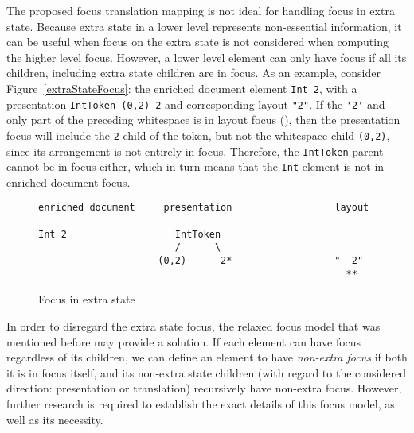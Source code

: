 The proposed focus translation mapping is not ideal for handling focus in extra state. Because extra state in a lower level represents non-essential information, it can be useful when focus on the extra state is not considered when computing the higher level focus. However, a lower level element can only have focus if all its children, including extra state children are in focus. As an example, consider Figure~\ref{extraStateFocus}: the enriched document element \verb|Int 2|, with a presentation \verb|IntToken (0,2) 2| and corresponding layout \verb|"|\textvisiblespace\textvisiblespace\verb|2"|. If the \verb|'2'| and only part of the preceding whitespace is in layout focus ({\tt \textvisiblespace{}}), then the presentation focus will include the \verb|2| child of the token, but not the whitespace child \verb|(0,2)|, since its arrangement is not entirely in focus. Therefore, the \verb|IntToken| parent cannot be in focus either, which in turn means that the \verb|Int| element is not in enriched document focus. 

\begin{figure}
\begin{small}
\begin{center}
\begin{verbatim}
enriched document     presentation                  layout

Int 2                   IntToken        
                        /      \           
                     (0,2)      2*                  "  2"
                                                      **

\end{verbatim}
\caption{Focus in extra state}\label{extraStateFocusunpresentableFocus} 
\end{center}
\end{small}
\end{figure}

In order to disregard the extra state focus, the relaxed focus model that was mentioned before may provide a solution. If each element can have focus regardless of its children, we can define an element to have {\em non-extra focus} if both it is in focus itself, and its non-extra state children (with regard to the considered direction: presentation or translation) recursively have non-extra focus. However, further research is required to establish the exact details of this focus model, as well as its necessity.

